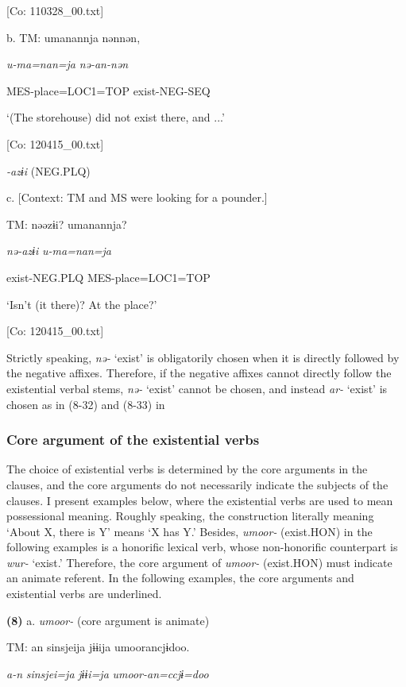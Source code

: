       [Co: 110328\_00.txt]

  b.  TM:  umanannja  nənnən,

      \textit{u-ma=nan=ja}  \textit{nə-an{}-nən}

      MES-place=LOC1=TOP  exist-NEG-SEQ

      ‘(The storehouse) did not exist there, and ...’

      [Co: 120415\_00.txt]

  \textit{{}-azɨi} (NEG.PLQ)

  c.  [Context: TM and MS were looking for a pounder.]

    TM:  nəəzɨi?  umanannja?

      \textit{nə-azɨi}  \textit{u-ma=nan=ja}

      exist-NEG.PLQ  MES-place=LOC1=TOP

      ‘Isn’t (it there)? At the place?’

      [Co: 120415\_00.txt]

Strictly speaking, \textit{nə-} ‘exist’ is obligatorily chosen when it is directly followed by the negative affixes. Therefore, if the negative affixes cannot directly follow the existential verbal stems, \textit{nə-} ‘exist’ cannot be chosen, and instead \textit{ar-} ‘exist’ is chosen as in (8-32) and (8-33) in 

\subsubsection{Core argument of the existential verbs}

The choice of existential verbs is determined by the core arguments in the clauses, and the core arguments do not necessarily indicate the subjects of the clauses. I present examples below, where the existential verbs are used to mean possessional meaning. Roughly speaking, the construction literally meaning ‘About X, there is Y’ means ‘X has Y.’ Besides, \textit{umoor-} (exist.HON) in the following examples is a honorific lexical verb, whose non-honorific counterpart is \textit{wur-} ‘exist.’ Therefore, the core argument of \textit{umoor-} (exist.HON) must indicate an animate referent. In the following examples, the core arguments and existential verbs are underlined.

\textbf{(8)}  a.  \textit{umoor-} (core argument is animate)

    TM:  an  sinsjeija  jɨɨija  umoorancjɨdoo.

      \textit{a-n}  \textit{sinsjei=ja}  \textit{jɨɨi=ja}  \textit{umoor{}-an=ccjɨ=doo}

